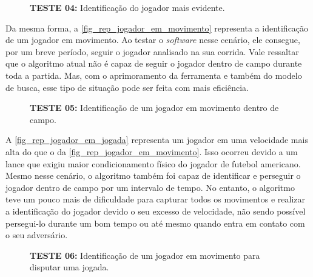 \clearpage

\begin{figure}[ht]
	\caption{\label{fig_rep_jogador_mais_evidente}\textbf{TESTE 04:} Identificação do jogador mais evidente.}
	\begin{center}
	\end{center}
	\centering {}
\end{figure}

Da mesma forma, a \autoref{fig_rep_jogador_em_movimento} representa a identificação de um jogador em movimento. Ao testar o \textit{software} nesse cenário, ele consegue, por um breve período, seguir o jogador analisado na sua corrida. Vale ressaltar que o algoritmo atual não é capaz de seguir o jogador dentro de campo durante toda a partida. Mas, com o aprimoramento da ferramenta e também do modelo de busca, esse tipo de situação pode ser feita com mais eficiência.


\begin{figure}[ht]
	\caption{\label{fig_rep_jogador_em_movimento}\textbf{TESTE 05:} Identificação de um jogador em movimento dentro de campo.}
	\begin{center}
	\end{center}
	\centering {}
\end{figure}

A \autoref{fig_rep_jogador_em_jogada} representa um jogador em uma velocidade mais alta do que o da \autoref{fig_rep_jogador_em_movimento}. Isso ocorreu devido a um lance que exigiu maior condicionamento físico do jogador de futebol americano. Mesmo nesse cenário, o algoritmo também foi capaz de identificar e perseguir o jogador dentro de campo por um intervalo de tempo. No entanto, o algoritmo teve um pouco mais de dificuldade para capturar todos os movimentos e realizar a identificação do  jogador devido o seu excesso de velocidade, não sendo possível persegui-lo durante um bom tempo ou até mesmo quando entra em contato com o seu adversário.


\begin{figure}[ht]
	\caption{\label{fig_rep_jogador_em_jogada}\textbf{TESTE 06:} Identificação de um jogador em movimento para disputar uma jogada.}
	\begin{center}
	\end{center}
	\centering {}
\end{figure}

